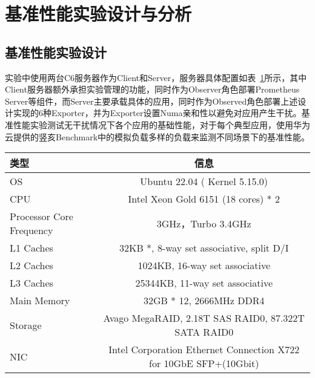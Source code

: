 \section{基准性能实验设计与分析}

\subsection{基准性能实验设计}

实验中使用两台C6服务器作为Client和Server，服务器具体配置如表~\ref{tab:c6_info}所示，其中Client服务器额外承担实验管理的功能，同时作为Observer角色部署Prometheus Server等组件，而Server主要承载具体的应用，同时作为Observed角色部署上述设计实现的6种Exporter，并为Exporter设置Numa亲和性以避免对应用产生干扰。基准性能实验测试无干扰情况下各个应用的基础性能，对于每个典型应用，使用华为云提供的竖亥Benchmark中的模拟负载多样的负载来监测不同场景下的基准性能。

\begin{table}[!htbp]
    \label{tab:c6_info}
    \footnotesize%
    \setlength{\tabcolsep}{4pt}%
    \renewcommand{\arraystretch}{1.25}%
    \centering
    \begin{tabular}{lc}
        \hline
        类型 & 信息 \\
        \hline
        OS & Ubuntu 22.04 ( Kernel 5.15.0) \\
        CPU & Intel Xeon Gold 6151 (18 cores) * 2 \\
        Processor Core Frequency & 3GHz，Turbo 3.4GHz \\
        L1 Caches & 32KB *,  8-way set associative, split D/I \\
        L2 Caches & 1024KB, 16-way set associative \\
        L3 Caches & 25344KB, 11-way set associative \\
        Main Memory & 32GB * 12, 2666MHz DDR4 \\
        Storage & Avago MegaRAID, 2.18T SAS RAID0, 87.322T SATA RAID0 \\
        NIC & Intel Corporation Ethernet Connection X722 for 10GbE SFP+(10Gbit) \\
        \hline
    \end{tabular}
\end{table}


